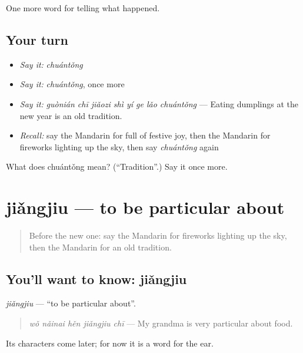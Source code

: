 \begin{grammarlens}[title={What you've built}]
One more word for telling what happened.
\end{grammarlens}

\subsection*{Your turn}
\begin{itemize}
\raggedright
  \item \emph{Say it:} \emph{chuántǒng}
  \item \emph{Say it:} \emph{chuántǒng}, once more
  \item \emph{Say it:} \emph{guònián chī jiǎozi shì yí ge lǎo chuántǒng} — Eating dumplings at the new year is an old tradition.
  \item \emph{Recall:} say the Mandarin for full of festive joy, then the Mandarin for fireworks lighting up the sky, then say \emph{chuántǒng} again
\end{itemize}

\begin{tcolorbox}[breakable,colback=teal!4,colframe=teal!35!black,title={Before you move on}]
What does chuántǒng mean? (\textquotedblleft{}Tradition\textquotedblright{}.) Say it once more.
\end{tcolorbox}
\section[jiǎngjiu]{jiǎngjiu — to be particular about}

\label{lesson:ZH-C340-jiangjiu}



\begin{quote}
Before the new one: say the Mandarin for fireworks lighting up the sky, then the Mandarin for an old tradition.
\end{quote}

\subsection*{You'll want to know: jiǎngjiu}
\emph{jiǎngjiu} — \textquotedblleft{}to be particular about\textquotedblright{}.

\begin{quote}
\emph{wǒ nǎinai hěn jiǎngjiu chī} — My grandma is very particular about food.
\end{quote}

Its characters come later; for now it is a word for the ear.

